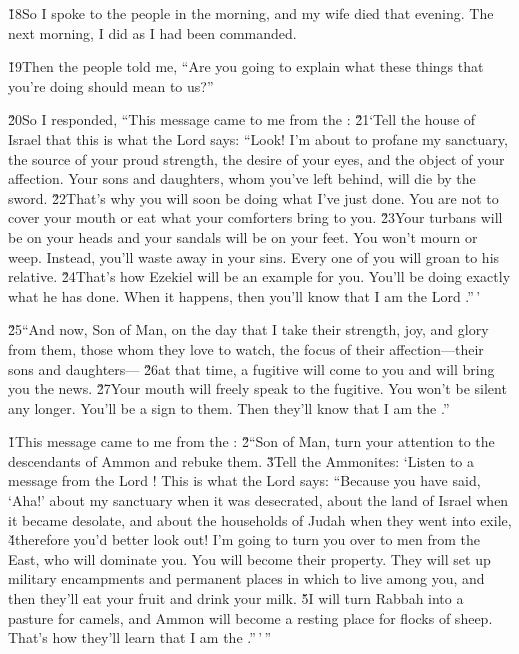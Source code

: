 \v{18}So I spoke to the people in the morning, and my wife died that evening. The next morning, I did as I had been commanded.

\v{19}Then the people told me, ``Are you going to explain what these things that you're doing should mean to us?''

\v{20}So I responded, ``This message came to me from the : \v{21}`Tell the house of Israel that this is what the Lord  says: ``Look! I'm about to profane my sanctuary, the source of your proud strength, the desire of your eyes, and the object of your affection. Your sons and daughters, whom you've left behind, will die by the sword. \v{22}That's why you will soon be doing what I've just done. You are not to cover your mouth or eat what your comforters bring to you. \v{23}Your turbans will be on your heads and your sandals will be on your feet. You won't mourn or weep. Instead, you'll waste away in your sins. Every one of you will groan to his relative. \v{24}That's how Ezekiel will be an example for you. You'll be doing exactly what he has done. When it happens, then you'll know that I am the Lord .''\,'

\v{25}``And now, Son of Man, on the day that I take their strength, joy, and glory from them, those whom they love to watch, the focus of their affection---their sons and daughters--- \v{26}at that time, a fugitive will come to you and will bring you the news. \v{27}Your mouth will freely speak to the fugitive. You won't be silent any longer. You'll be a sign to them. Then they'll know that I am the .''

\v{1}This message came to me from the : \v{2}``Son of Man, turn your attention to the descendants of Ammon and rebuke them. \v{3}Tell the Ammonites: `Listen to a message from the Lord ! This is what the Lord  says: ``Because you have said, `Aha!' about my sanctuary when it was desecrated, about the land of Israel when it became desolate, and about the households of Judah when they went into exile, \v{4}therefore you'd better look out! I'm going to turn you over to men from the East, who will dominate you. You will become their property. They will set up military encampments and permanent places in which to live among you, and then they'll eat your fruit and drink your milk. \v{5}I will turn Rabbah into a pasture for camels, and Ammon will become a resting place for flocks of sheep. That's how they'll learn that I am the .''\,'\,''

